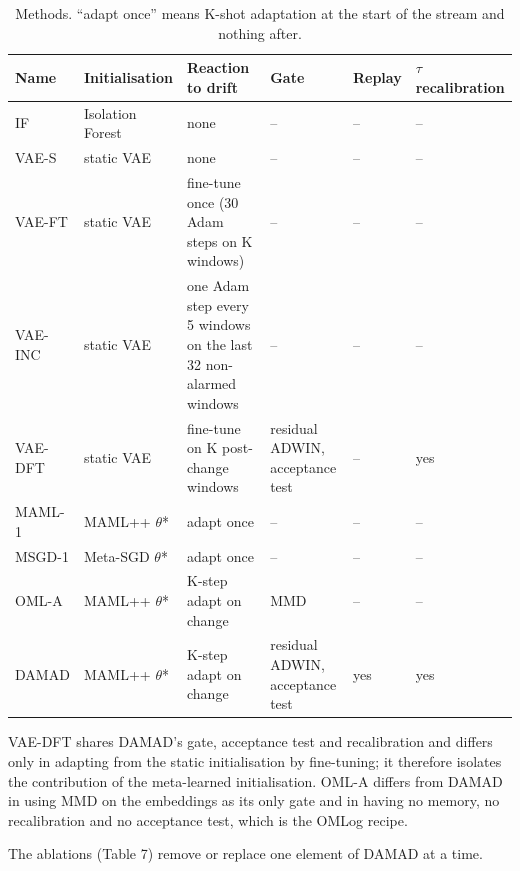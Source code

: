 \begin{table}[H]
\caption{Methods. ``adapt once'' means K-shot adaptation at the start of the stream and nothing after.}
\centering\small
\begin{tabularx}{\textwidth}{>{\raggedright\arraybackslash\hsize=1.500\hsize}X>{\raggedright\arraybackslash\hsize=0.686\hsize}X>{\raggedright\arraybackslash\hsize=1.831\hsize}X>{\raggedright\arraybackslash\hsize=1.182\hsize}X>{\centering\arraybackslash\hsize=0.229\hsize}X>{\raggedright\arraybackslash\hsize=0.572\hsize}X}
\toprule
\textbf{Name} & \textbf{Initialisation} & \textbf{Reaction to drift} & \textbf{Gate} & \textbf{Replay} & \textbf{\ensuremath{\tau} recalibration} \\
\midrule
IF & Isolation Forest \citep{liu2008iforest} & none & -- & -- & -- \\
VAE-S & static VAE & none & -- & -- & -- \\
VAE-FT & static VAE & fine-tune once (30 Adam steps on K windows) & -- & -- & -- \\
VAE-INC & static VAE & one Adam step every 5 windows on the last 32 non-alarmed windows \citep{wahab2022online} & -- & -- & -- \\
VAE-DFT & static VAE & fine-tune on K post-change windows & residual ADWIN, acceptance test & -- & yes \\
MAML-1 & MAML++ \ensuremath{\theta}* & adapt once \citep{moon2023mavae} & -- & -- & -- \\
MSGD-1 & Meta-SGD \ensuremath{\theta}* & adapt once & -- & -- & -- \\
OML-A & MAML++ \ensuremath{\theta}* & K-step adapt on change \citep{tian2024omlog} & MMD & -- & -- \\
DAMAD & MAML++ \ensuremath{\theta}* & K-step adapt on change & residual ADWIN, acceptance test & yes & yes \\
\bottomrule
\end{tabularx}
\end{table}

VAE-DFT shares DAMAD's gate, acceptance test and recalibration and differs only in adapting from the static initialisation by fine-tuning; it therefore isolates the contribution of the meta-learned initialisation. OML-A differs from DAMAD in using MMD on the embeddings as its only gate and in having no memory, no recalibration and no acceptance test, which is the OMLog recipe.

The ablations (Table 7) remove or replace one element of DAMAD at a time.

